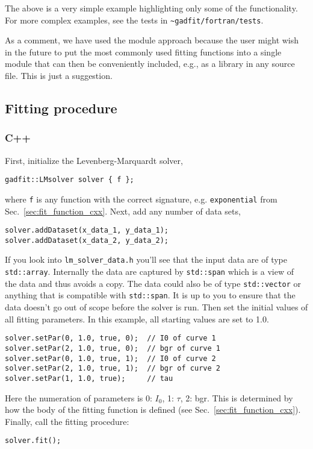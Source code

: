 \documentclass{article}
\begin{document}
The above is a very simple example highlighting only some of the functionality. For more complex examples, see the tests in \verb+~gadfit/fortran/tests+.

As a comment, we have used the module approach because the user might wish in the future to put the most commonly used fitting functions into a single module that can then be conveniently included, e.g., as a library in any source file. This is just a suggestion.

\subsection{Fitting procedure}

\subsubsection{C++}

First, initialize the Levenberg-Marquardt solver,
\begin{verbatim}
gadfit::LMsolver solver { f };
\end{verbatim}
where \texttt{f} is any function with the correct signature, e.g. \texttt{exponential} from Sec.~\ref{sec:fit_function_cxx}. Next, add any number of data sets,
\begin{verbatim}
solver.addDataset(x_data_1, y_data_1);
solver.addDataset(x_data_2, y_data_2);
\end{verbatim}
If you look into \verb+lm_solver_data.h+ you'll see that the input data are of type \texttt{std::array}. Internally the data are captured by \texttt{std::span} which is a view of the data and thus avoids a copy. The data could also be of type \texttt{std::vector} or anything that is compatible with \texttt{std::span}. It is up to you to ensure that the data doesn't go out of scope before the solver is run. Then set the initial values of all fitting parameters. In this example, all starting values are set to 1.0.
\begin{verbatim}
solver.setPar(0, 1.0, true, 0);  // I0 of curve 1
solver.setPar(2, 1.0, true, 0);  // bgr of curve 1
solver.setPar(0, 1.0, true, 1);  // I0 of curve 2
solver.setPar(2, 1.0, true, 1);  // bgr of curve 2
solver.setPar(1, 1.0, true);     // tau
\end{verbatim}
Here the numeration of parameters is 0: $I_0$, 1: $\tau$, 2: bgr. This is determined by how the body of the fitting function is defined (see Sec.~\ref{sec:fit_function_cxx}). Finally, call the fitting procedure:
\begin{verbatim}
solver.fit();
\end{verbatim}
\end{document}

